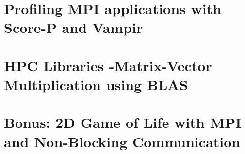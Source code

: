 \documentclass[a4paper,10pt]{article}
\begin{document}

\section{Profiling MPI applications with Score-P and Vampir}

\section{HPC Libraries -Matrix-Vector Multiplication using BLAS}

\section{Bonus: 2D Game of Life with MPI and Non-Blocking Communication}


\end{document}
